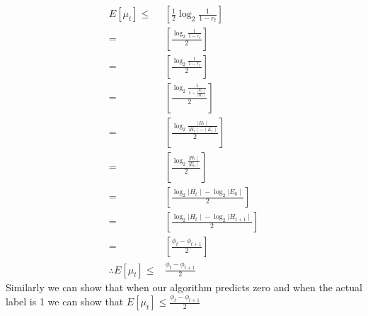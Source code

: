 \documentclass{article}
\begin{document}
\begin{description}
    \begin{align*}
      E[\mu_{t}] \le & [\frac{1}{2} \log_2{\frac{1}{1 - r_{t}}}] \\
      = & [ \frac{\log_2{\frac{1}{1 - r_{t}}}}{2}] \\
      = & [ \frac{\log_2{\frac{1}{1 - r_{t}}}}{2}] \\
      = & [ \frac{\log_2{\frac{1}{1 - \frac{\mid E_{1} \mid}{\mid H_{t} \mid}}}}{2}] \\
      = & [ \frac{\log_2{\frac{\mid H_{t} \mid}{\mid H_{t} \mid - \mid E_{1} \mid}}}{2}] \\
      = & [ \frac{\log_2{\frac{\mid H_{t} \mid}{\mid E_{0} \mid}}}{2}] \\
      = & [ \frac{\log_2{\mid H_{t} \mid} - \log_2{\mid E_{0} \mid}}{2}] \\
      = & [ \frac{\log_2{\mid H_{t} \mid} - \log_2{\mid H_{t+1} \mid}}{2}] \\
      = & [ \frac{\phi_{t} - \phi_{t+1}}{2}] \\
      \therefore E[\mu_{t}] \le &  \frac{\phi_{t} - \phi_{t+1}}{2}
    \end{align*}
    Similarly we can show that when our algorithm predicts zero and when the actual label is 1 we can show that  $ E[\mu_{t}] \le \frac{\phi_{t} - \phi_{t+1}}{2} $

\end{description}
\end{document}
